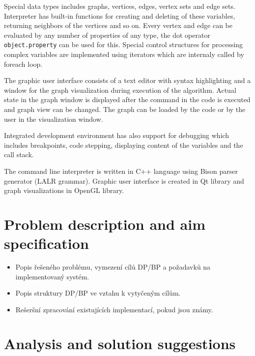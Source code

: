 \documentclass[11pt,twoside,a4paper]{book}
\begin{document}
Special data types includes graphs, vertices, edges, vertex sets and edge sets. Interpreter has built-in functions for creating and deleting of these variables, returning neighbors of the vertices and so on. Every vertex and edge can be evaluated by any number of properties of any type, the dot operator \texttt{object.property} can be used for this. Special control structures for processing complex variables are implemented using iterators which are internaly called by foreach loop.

The graphic user interface consists of a text editor with syntax highlighting and a window for the graph visualization during execution of the algorithm. Actual state in the graph window is displayed after the command in the code is executed and graph view can be changed. The graph can be loaded by the code or by the user in the visualization window.

Integrated development environment has also support for debugging which includes breakpoints, code stepping, displaying content of the variables and the call stack.

The command line interpreter is written in C++ language using Bison parser generator (LALR grammar). Graphic user interface is created in Qt library and graph visualizations in OpenGL library.



\chapter{Problem description and aim specification}

\begin{itemize}
\item Popis řešeného problému, vymezení cílů DP/BP a požadavků na implementovaný systém.
\item Popis struktury DP/BP ve vztahu k vytyčeným cílům.
\item Rešeršní zpracování existujících implementací, pokud jsou známy.
\end{itemize}



\chapter{Analysis and solution suggestions}
\end{document}
